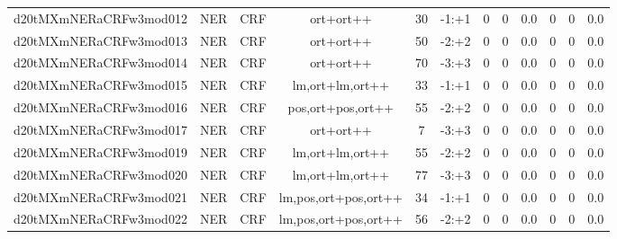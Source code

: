 \documentclass[a4paper]{article}
\begin{document}
\begin{landscape}
\begin{center}
\begin{tabular}{ |c|c|c|c|c|c|c|c|c|c|c|c|}
 
 	
 	\small{ d20tMXmNERaCRFw3mod012 } & \small{ NER} & \small{  CRF }  & ort+ort++  &  30 &  \small{  -1:+1 }  &  0 & 0 & 0.0  &  0 & 0 & 0.0 \\
 	

 
 	
 	\small{ d20tMXmNERaCRFw3mod013 } & \small{ NER} & \small{  CRF }  & ort+ort++  &  50 &  \small{  -2:+2 }  &  0 & 0 & 0.0  &  0 & 0 & 0.0 \\
 	

 
 	
 	\small{ d20tMXmNERaCRFw3mod014 } & \small{ NER} & \small{  CRF }  & ort+ort++  &  70 &  \small{  -3:+3 }  &  0 & 0 & 0.0  &  0 & 0 & 0.0 \\
 	

 
 	
 	\small{ d20tMXmNERaCRFw3mod015 } & \small{ NER} & \small{  CRF }  & lm,ort+lm,ort++  &  33 &  \small{  -1:+1 }  &  0 & 0 & 0.0  &  0 & 0 & 0.0 \\
 	

 
 	
 	\small{ d20tMXmNERaCRFw3mod016 } & \small{ NER} & \small{  CRF }  & pos,ort+pos,ort++  &  55 &  \small{  -2:+2 }  &  0 & 0 & 0.0  &  0 & 0 & 0.0 \\
 	

 
 	
 	\small{ d20tMXmNERaCRFw3mod017 } & \small{ NER} & \small{  CRF }  & ort+ort++  &  7 &  \small{  -3:+3 }  &  0 & 0 & 0.0  &  0 & 0 & 0.0 \\
 	

 
 	
 	\small{ d20tMXmNERaCRFw3mod019 } & \small{ NER} & \small{  CRF }  & lm,ort+lm,ort++  &  55 &  \small{  -2:+2 }  &  0 & 0 & 0.0  &  0 & 0 & 0.0 \\
 	

 
 	
 	\small{ d20tMXmNERaCRFw3mod020 } & \small{ NER} & \small{  CRF }  & lm,ort+lm,ort++  &  77 &  \small{  -3:+3 }  &  0 & 0 & 0.0  &  0 & 0 & 0.0 \\
 	

 
 	
 	\small{ d20tMXmNERaCRFw3mod021 } & \small{ NER} & \small{  CRF }  & lm,pos,ort+pos,ort++  &  34 &  \small{  -1:+1 }  &  0 & 0 & 0.0  &  0 & 0 & 0.0 \\
 	

 
 	
 	\small{ d20tMXmNERaCRFw3mod022 } & \small{ NER} & \small{  CRF }  & lm,pos,ort+pos,ort++  &  56 &  \small{  -2:+2 }  &  0 & 0 & 0.0  &  0 & 0 & 0.0 \\
 	


\end{tabular}
\end{center}
\end{landscape}
\end{document}
